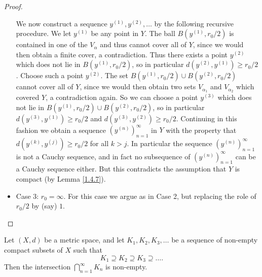 \begin{proof}
\begin{itemize}
              We now construct a sequence \(y^{(1)}, y^{(2)}, \dots\) by the following recursive procedure.
              We let \(y^{(1)}\) be any point in \(Y\).
              The ball \(B(y^{(1)}, r_0 / 2)\) is contained in one of the \(V_{\alpha}\) and thus cannot cover all of \(Y\), since we would then obtain a finite cover, a contradiction.
              Thus there exists a point \(y^{(2)}\) which does not lie in \(B(y^{(1)}, r_0 / 2)\), so in particular \(d(y^{(2)}, y^{(1)}) \geq r_0 / 2\).
              Choose such a point \(y^{(2)}\).
              The set \(B(y^{(1)}, r_0 / 2) \cup B(y^{(2)}, r_0 / 2)\) cannot cover all of \(Y\), since we would then obtain two sets \(V_{\alpha_1}\) and \(V_{\alpha_2}\) which covered \(Y\), a contradiction again.
              So we can choose a point \(y^{(3)}\) which does not lie in \(B(y^{(1)}, r_0 / 2) \cup B(y^{(2)}, r_0 / 2)\), so in particular \(d(y^{(3)}, y^{(1)}) \geq r_0 / 2\) and \(d(y^{(3)}, y^{(2)}) \geq r_0 / 2\).
              Continuing in this fashion we obtain a sequence \((y^{(n)})_{n = 1}^\infty\) in \(Y\) with the property that \(d(y^{(k)}, y^{(j)}) \geq r_0 / 2\) for all \(k > j\).
              In particular the sequence \((y^{(n)})_{n = 1}^\infty\) is not a Cauchy sequence, and in fact no subsequence of \((y^{(n)})_{n = 1}^\infty\) can be a Cauchy sequence either.
              But this contradicts the assumption that \(Y\) is compact (by Lemma \ref{1.4.7}).
        \item Case 3:
              \(r_0 = \infty\).
              For this case we argue as in Case 2, but replacing the role of \(r_0 / 2\) by (say) \(1\).
    \end{itemize}
\end{proof}

\begin{corollary}\label{1.5.9}
    Let \((X, d)\) be a metric space, and let \(K_1, K_2, K_3, \dots\) be a sequence of non-empty compact subsets of \(X\) such that
    \[
        K_1 \supseteq K_2 \supseteq K_3 \supseteq \dots.
    \]
    Then the intersection \(\bigcap_{n = 1}^\infty K_n\) is non-empty.
\end{corollary}


